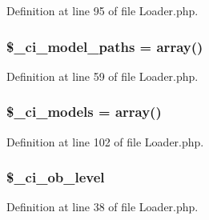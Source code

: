 Definition at line 95 of file Loader.\-php.

\hypertarget{class_c_i___loader_ac5f53015a6bd6ce67af5e30cb156cce4}{
\subsubsection[{\$\-\_\-ci\-\_\-model\-\_\-paths}]{\setlength{\rightskip}{0pt plus 5cm}\$\-\_\-ci\-\_\-model\-\_\-paths = array()\hspace{0.3cm}{\ttfamily [protected]}}}\label{class_c_i___loader_ac5f53015a6bd6ce67af5e30cb156cce4}


Definition at line 59 of file Loader.\-php.

\hypertarget{class_c_i___loader_adf3c08ef6905b17b2237bfa89d556f2c}{
\subsubsection[{\$\-\_\-ci\-\_\-models}]{\setlength{\rightskip}{0pt plus 5cm}\$\-\_\-ci\-\_\-models = array()\hspace{0.3cm}{\ttfamily [protected]}}}\label{class_c_i___loader_adf3c08ef6905b17b2237bfa89d556f2c}


Definition at line 102 of file Loader.\-php.

\hypertarget{class_c_i___loader_a499cf11349613b24142f9c13aa83ee1b}{
\subsubsection[{\$\-\_\-ci\-\_\-ob\-\_\-level}]{\setlength{\rightskip}{0pt plus 5cm}\$\-\_\-ci\-\_\-ob\-\_\-level\hspace{0.3cm}{\ttfamily [protected]}}}\label{class_c_i___loader_a499cf11349613b24142f9c13aa83ee1b}


Definition at line 38 of file Loader.\-php.

